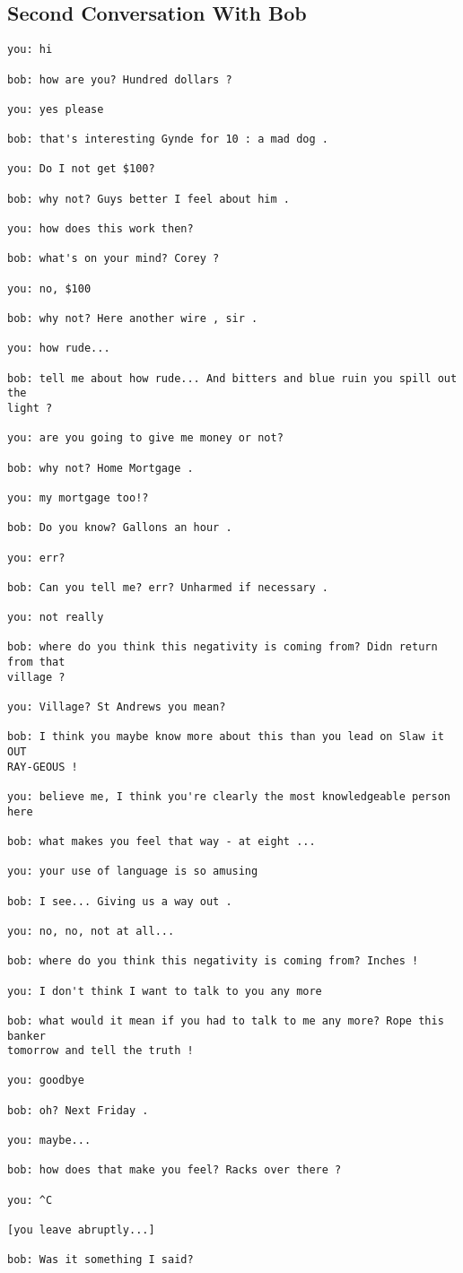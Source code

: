 \documentclass[]{article}
\begin{document}
\subsection{Second Conversation With Bob}
\begin{verbatim}
you: hi

bob: how are you? Hundred dollars ?

you: yes please

bob: that's interesting Gynde for 10 : a mad dog .

you: Do I not get $100?

bob: why not? Guys better I feel about him .

you: how does this work then?

bob: what's on your mind? Corey ?

you: no, $100

bob: why not? Here another wire , sir .

you: how rude...

bob: tell me about how rude... And bitters and blue ruin you spill out the 
light ?

you: are you going to give me money or not?

bob: why not? Home Mortgage .

you: my mortgage too!?

bob: Do you know? Gallons an hour .

you: err?

bob: Can you tell me? err? Unharmed if necessary .

you: not really

bob: where do you think this negativity is coming from? Didn return from that 
village ?

you: Village? St Andrews you mean?

bob: I think you maybe know more about this than you lead on Slaw it OUT 
RAY-GEOUS !

you: believe me, I think you're clearly the most knowledgeable person here

bob: what makes you feel that way - at eight ...

you: your use of language is so amusing

bob: I see... Giving us a way out .

you: no, no, not at all...

bob: where do you think this negativity is coming from? Inches !

you: I don't think I want to talk to you any more

bob: what would it mean if you had to talk to me any more? Rope this banker 
tomorrow and tell the truth !

you: goodbye

bob: oh? Next Friday .

you: maybe...

bob: how does that make you feel? Racks over there ?

you: ^C

[you leave abruptly...]

bob: Was it something I said?
\end{verbatim}
\end{document}
